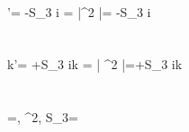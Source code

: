 \\
{\omega}'= -S_3  i \omega = \left |\beta^2 \right |=
-S_3 \frac {\beta}{\left | \beta \right |} \sqrt{} i\omega
\\
\\
\\
{k}'= +S_3  ik = \left | \beta^2 \right |=+S_3 \frac {\beta}{\left | \beta \right |} \sqrt{} ik
\\
\\
\\
\beta=, \beta^2, S_3= 

